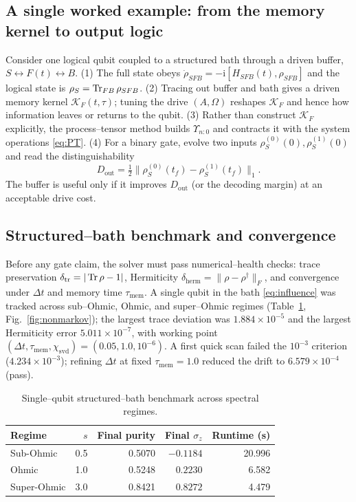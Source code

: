 \documentclass[11pt,a4paper]{article}
\theoremstyle{plain}
\theoremstyle{definition}
\theoremstyle{remark}
\newcommand{\ii}{\mathrm{i}}
\newcommand{\calK}{\mathcal{K}}
\begin{document}
\subsection{A single worked example: from the memory kernel to output logic}
Consider one logical qubit coupled to a structured bath through a driven
buffer, $S\leftrightarrow F(t)\leftrightarrow B$. (1) The full state obeys
$\dot\rho_{SFB}=-\ii[H_{SFB}(t),\rho_{SFB}]$ and the logical state is
$\rho_S=\Tr_{FB}\rho_{SFB}$. (2) Tracing out buffer and bath gives a
driven memory kernel $\calK_F(t,\tau)$; tuning the drive $(A,\Omega)$
reshapes $\calK_F$ and hence how information leaves or returns to the
qubit. (3) Rather than construct $\calK_F$ explicitly, the process--tensor
method builds $\Upsilon_{n:0}$ and contracts it with the system operations
\eqref{eq:PT}. (4) For a binary gate, evolve two inputs
$\rho_S^{(0)}(0),\rho_S^{(1)}(0)$ and read the distinguishability
\begin{equation}
D_{\mathrm{out}}=\tfrac12\big\|\rho_S^{(0)}(t_f)-\rho_S^{(1)}(t_f)\big\|_1 .
\label{eq:tracedist}
\end{equation}
The buffer is useful only if it improves $D_{\mathrm{out}}$ (or the
decoding margin) at an acceptable drive cost.

\subsection{Structured--bath benchmark and convergence}
Before any gate claim, the solver must pass numerical--health checks:
trace preservation $\delta_{\mathrm{tr}}=|\Tr\rho-1|$, Hermiticity
$\delta_{\mathrm{herm}}=\|\rho-\rho^\dagger\|_F$, and convergence under
$\Delta t$ and memory time $\tau_{\mathrm{mem}}$. A single qubit in the
bath \eqref{eq:influence} was tracked across sub--Ohmic, Ohmic, and
super--Ohmic regimes (Table~\ref{tab:struct-bath},
Fig.~\ref{fig:nonmarkov}); the largest trace deviation was
$1.884\times10^{-5}$ and the largest Hermiticity error
$5.011\times10^{-7}$, with working point
$(\Delta t,\tau_{\mathrm{mem}},\chi_{\mathrm{svd}})=(0.05,1.0,10^{-6})$.
A first quick scan failed the $10^{-3}$ criterion ($4.234\times10^{-3}$);
refining $\Delta t$ at fixed $\tau_{\mathrm{mem}}=1.0$ reduced the drift
to $6.579\times10^{-4}$ (pass).

\begin{table}[H]\centering\small
\caption{Single--qubit structured--bath benchmark across spectral regimes.}
\label{tab:struct-bath}
\begin{tabular}{lrrrr}
\toprule
Regime & $s$ & Final purity & Final $\sigma_z$ & Runtime (s) \\
\midrule
Sub-Ohmic & 0.5 & 0.5070 & $-0.1184$ & 20.996 \\
Ohmic & 1.0 & 0.5248 & $0.2230$ & 6.582 \\
Super-Ohmic & 3.0 & 0.8421 & $0.8272$ & 4.479 \\
\bottomrule
\end{tabular}
\end{table}
\end{document}
